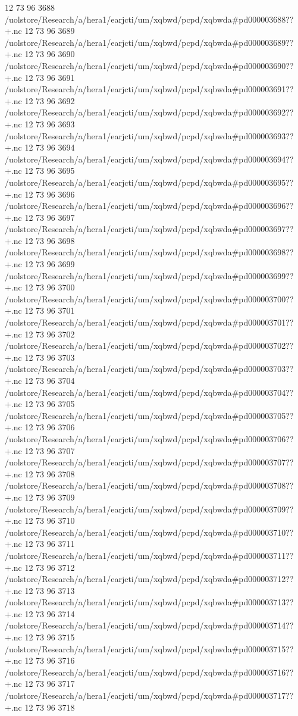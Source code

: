 12 73 96
3688
/uolstore/Research/a/hera1/earjcti/um/xqbwd/pcpd/xqbwda#pd000003688??+.nc
12 73 96
3689
/uolstore/Research/a/hera1/earjcti/um/xqbwd/pcpd/xqbwda#pd000003689??+.nc
12 73 96
3690
/uolstore/Research/a/hera1/earjcti/um/xqbwd/pcpd/xqbwda#pd000003690??+.nc
12 73 96
3691
/uolstore/Research/a/hera1/earjcti/um/xqbwd/pcpd/xqbwda#pd000003691??+.nc
12 73 96
3692
/uolstore/Research/a/hera1/earjcti/um/xqbwd/pcpd/xqbwda#pd000003692??+.nc
12 73 96
3693
/uolstore/Research/a/hera1/earjcti/um/xqbwd/pcpd/xqbwda#pd000003693??+.nc
12 73 96
3694
/uolstore/Research/a/hera1/earjcti/um/xqbwd/pcpd/xqbwda#pd000003694??+.nc
12 73 96
3695
/uolstore/Research/a/hera1/earjcti/um/xqbwd/pcpd/xqbwda#pd000003695??+.nc
12 73 96
3696
/uolstore/Research/a/hera1/earjcti/um/xqbwd/pcpd/xqbwda#pd000003696??+.nc
12 73 96
3697
/uolstore/Research/a/hera1/earjcti/um/xqbwd/pcpd/xqbwda#pd000003697??+.nc
12 73 96
3698
/uolstore/Research/a/hera1/earjcti/um/xqbwd/pcpd/xqbwda#pd000003698??+.nc
12 73 96
3699
/uolstore/Research/a/hera1/earjcti/um/xqbwd/pcpd/xqbwda#pd000003699??+.nc
12 73 96
3700
/uolstore/Research/a/hera1/earjcti/um/xqbwd/pcpd/xqbwda#pd000003700??+.nc
12 73 96
3701
/uolstore/Research/a/hera1/earjcti/um/xqbwd/pcpd/xqbwda#pd000003701??+.nc
12 73 96
3702
/uolstore/Research/a/hera1/earjcti/um/xqbwd/pcpd/xqbwda#pd000003702??+.nc
12 73 96
3703
/uolstore/Research/a/hera1/earjcti/um/xqbwd/pcpd/xqbwda#pd000003703??+.nc
12 73 96
3704
/uolstore/Research/a/hera1/earjcti/um/xqbwd/pcpd/xqbwda#pd000003704??+.nc
12 73 96
3705
/uolstore/Research/a/hera1/earjcti/um/xqbwd/pcpd/xqbwda#pd000003705??+.nc
12 73 96
3706
/uolstore/Research/a/hera1/earjcti/um/xqbwd/pcpd/xqbwda#pd000003706??+.nc
12 73 96
3707
/uolstore/Research/a/hera1/earjcti/um/xqbwd/pcpd/xqbwda#pd000003707??+.nc
12 73 96
3708
/uolstore/Research/a/hera1/earjcti/um/xqbwd/pcpd/xqbwda#pd000003708??+.nc
12 73 96
3709
/uolstore/Research/a/hera1/earjcti/um/xqbwd/pcpd/xqbwda#pd000003709??+.nc
12 73 96
3710
/uolstore/Research/a/hera1/earjcti/um/xqbwd/pcpd/xqbwda#pd000003710??+.nc
12 73 96
3711
/uolstore/Research/a/hera1/earjcti/um/xqbwd/pcpd/xqbwda#pd000003711??+.nc
12 73 96
3712
/uolstore/Research/a/hera1/earjcti/um/xqbwd/pcpd/xqbwda#pd000003712??+.nc
12 73 96
3713
/uolstore/Research/a/hera1/earjcti/um/xqbwd/pcpd/xqbwda#pd000003713??+.nc
12 73 96
3714
/uolstore/Research/a/hera1/earjcti/um/xqbwd/pcpd/xqbwda#pd000003714??+.nc
12 73 96
3715
/uolstore/Research/a/hera1/earjcti/um/xqbwd/pcpd/xqbwda#pd000003715??+.nc
12 73 96
3716
/uolstore/Research/a/hera1/earjcti/um/xqbwd/pcpd/xqbwda#pd000003716??+.nc
12 73 96
3717
/uolstore/Research/a/hera1/earjcti/um/xqbwd/pcpd/xqbwda#pd000003717??+.nc
12 73 96
3718
